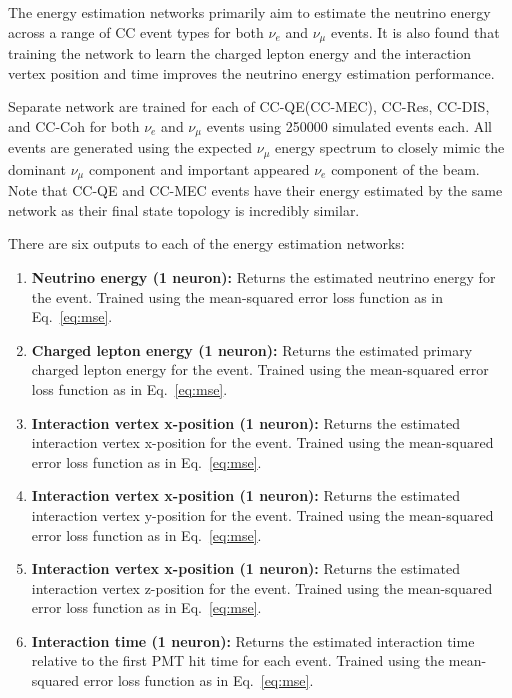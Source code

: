 The energy estimation networks primarily aim to estimate the neutrino energy across a range of CC
event types for both $\nu_{e}$ and $\nu_{\mu}$ events. It is also found that training the network
to learn the charged lepton energy and the interaction vertex position and time improves the
neutrino energy estimation performance.

Separate network are trained for each of CC-QE(CC-MEC), CC-Res, CC-DIS, and CC-Coh for both
$\nu_{e}$ and $\nu_{\mu}$ events using 250000 simulated events each. All events are generated
using the expected \chips $\nu_{\mu}$ energy spectrum to closely mimic the dominant $\nu_{\mu}$
component and important appeared $\nu_{e}$ component of the beam. Note that CC-QE and CC-MEC
events have their energy estimated by the same network as their final state topology is
incredibly similar.

There are six outputs to each of the energy estimation networks:
\begin{enumerate}
    \item \textbf{Neutrino energy (1 neuron):} Returns the estimated neutrino energy for the
          event. Trained using the mean-squared error loss function as in Eq.~\ref{eq:mse}.
    \item \textbf{Charged lepton energy (1 neuron):} Returns the estimated primary charged lepton
          energy for the event. Trained using the mean-squared error loss function as in
          Eq.~\ref{eq:mse}.
    \item \textbf{Interaction vertex x-position (1 neuron):} Returns the estimated interaction
          vertex x-position for the event. Trained using the mean-squared error loss function as
          in Eq.~\ref{eq:mse}.
    \item \textbf{Interaction vertex x-position (1 neuron):} Returns the estimated interaction
          vertex y-position for the event. Trained using the mean-squared error loss function as
          in Eq.~\ref{eq:mse}.
    \item \textbf{Interaction vertex x-position (1 neuron):} Returns the estimated interaction
          vertex z-position for the event. Trained using the mean-squared error loss function as
          in Eq.~\ref{eq:mse}.
    \item \textbf{Interaction time (1 neuron):} Returns the estimated interaction time relative to
          the first PMT hit time for each event. Trained using the mean-squared error loss
          function as in Eq.~\ref{eq:mse}.
\end{enumerate}

